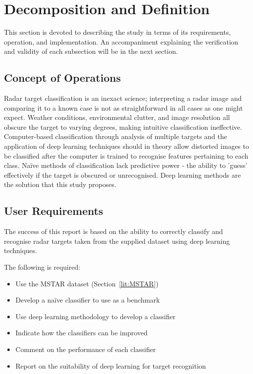 \section{Decomposition and Definition}
This section is devoted to describing the study in terms of its requirements, operation, and implementation. An accompaniment explaining the verification and validity of each subsection will be in the next section.
\subsection{Concept of Operations}
Radar target classification is an inexact science; interpreting a radar image and comparing it to a known case is not as straightforward in all cases as one might expect. Weather conditions, environmental clutter, and image resolution all obscure the target to varying degrees, making intuitive classification ineffective. Computer-based classification through analysis of multiple targets and the application of deep learning techniques should in theory allow distorted images to be classified after the computer is trained to recognise features pertaining to each class. Na{\"i}ve methods of classification lack predictive power - the ability to 'guess' effectively if the target is obscured or unrecognised. Deep learning methods are the solution that this study proposes.

\subsection{User Requirements}
The success of this report is based on the ability to correctly classify and recognise radar targets taken from the supplied dataset using deep learning techniques. 

The following is required:

\begin{itemize}
	\item Use the MSTAR dataset (Section~\ref{lit:MSTAR})
	\item Develop a na{\"i}ve classifier to use as a benchmark
	\item Use deep learning methodology to develop a classifier 
	\item Indicate how the classifiers can be improved
	\item Comment on the performance of each classifier
	\item Report on the suitability of deep learning for target recognition
\end{itemize}

